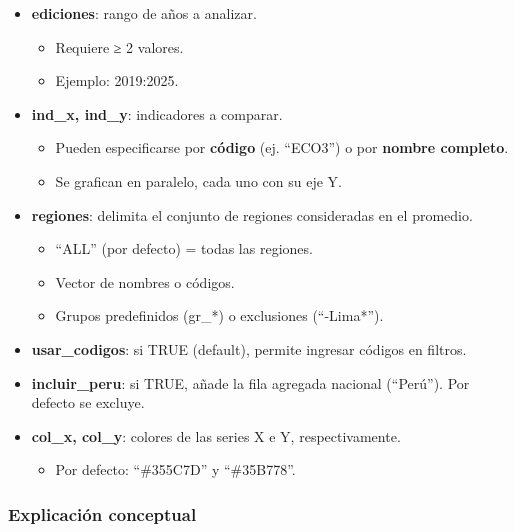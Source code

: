 \documentclass[
  11pt,
  letterpaper,
  DIV=11,
  numbers=noendperiod]{scrartcl}
\providecommand{\tightlist}{%
  \setlength{\itemsep}{0pt}\setlength{\parskip}{0pt}}\usepackage{longtable,booktabs,array}
\begin{document}
\begin{itemize}
\item
  \textbf{ediciones}: rango de años a analizar.

  \begin{itemize}
  \item
    Requiere ≥ 2 valores.
  \item
    Ejemplo: 2019:2025.
  \end{itemize}
\item
  \textbf{ind\_x, ind\_y}: indicadores a comparar.

  \begin{itemize}
  \item
    Pueden especificarse por \textbf{código} (ej. ``ECO3'') o por
    \textbf{nombre completo}.
  \item
    Se grafican en paralelo, cada uno con su eje Y.
  \end{itemize}
\item
  \textbf{regiones}: delimita el conjunto de regiones consideradas en el
  promedio.

  \begin{itemize}
  \item
    ``ALL'' (por defecto) = todas las regiones.
  \item
    Vector de nombres o códigos.
  \item
    Grupos predefinidos (gr\_*) o exclusiones (``-Lima*'').
  \end{itemize}
\item
  \textbf{usar\_codigos}: si TRUE (default), permite ingresar códigos en
  filtros.
\item
  \textbf{incluir\_peru}: si TRUE, añade la fila agregada nacional
  (``Perú''). Por defecto se excluye.
\item
  \textbf{col\_x, col\_y}: colores de las series X e Y, respectivamente.

  \begin{itemize}
  \tightlist
  \item
    Por defecto: ``\#355C7D'' y ``\#35B778''.
  \end{itemize}
\end{itemize}

\subsubsection{\texorpdfstring{\textbf{Explicación
conceptual}}{Explicación conceptual}}\label{explicaciuxf3n-conceptual-20}
\end{document}
